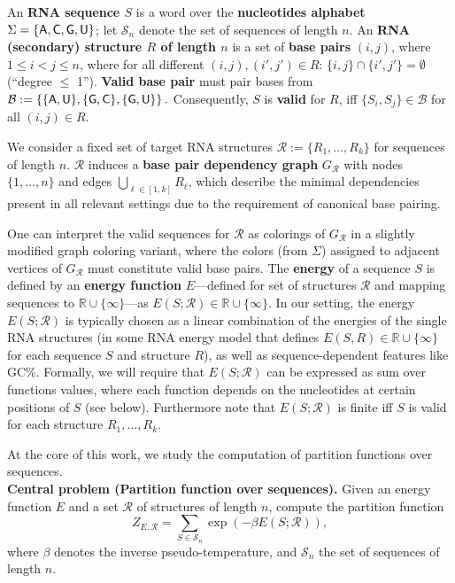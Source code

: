 \documentclass{bioinfo}
\newcommand{\partfun}[1]{Z_{#1}}
\newcommand{\B}{\mathcal{B}}
\newcommand{\R}{\mathcal{R}}
\renewcommand{\S}{\mathcal{S}}
\newcommand{\Def}[1]{{\bfseries #1}}
\newcommand{\Nuc}[1]{{\sf #1}}
\newcommand{\Ab}{\Nuc{A}}
\newcommand{\Cb}{\Nuc{C}}
\newcommand{\Gb}{\Nuc{G}}
\newcommand{\Ub}{\Nuc{U}}
\newcommand{\GCb}{\Gb\Cb}
\newcommand{\Energy}[2]{E(#2;#1)}
\begin{document}
An \Def{RNA sequence $S$} is a word over the \Def{nucleotides
  alphabet} $\Sigma=\{\Ab,\Cb,\Gb,\Ub\}$; let $\S_n$ denote the set of
sequences of length $n$. An \Def{RNA (secondary) structure $R$ of
  length $n$} is a set of \Def{base pairs} $(i,j)$, where
$1\leq i<j\leq n$, where for all different $(i,j), (i',j')\in R$:
$\{i,j\}\cap\{i',j'\}=\emptyset$ (``degree $\leq$ 1'').
%
%
\Def{Valid base pair} must pair bases from
$\B:=\left\{\{\Ab,\Ub\},\{\Gb,\Cb\},\{\Gb,\Ub\}\right\}.$
Consequently, $S$ is \Def{valid} for $R$, iff $\{S_i,S_j\}\in \B$ for
all $(i,j)\in R$.

We consider a fixed set of target RNA structures
$\R:=\{R_1, \dots, R_k\}$ for sequences of length $n$. $\R$ induces a
\Def{base pair dependency graph} $G_{\R}$ with nodes $\{1,\dots,n\}$
and edges $\bigcup_{\ell\in[1,k]} R_\ell$, which describe the minimal
dependencies present in all relevant settings due to the requirement
of canonical base pairing.

One can interpret the valid sequences for $\R$ as colorings of
$G_{\R}$ in a slightly modified graph coloring variant, where the
colors (from $\Sigma$) assigned to adjacent vertices of $G_{\R}$ must
constitute valid base pairs.
%
The \Def{energy} of a sequence $S$ is defined by an \Def{energy
  function} $E$---defined for set of structures $\R$ and mapping
sequences to $\mathbb{R}\cup\{\infty\}$---as
$\Energy{\R}{S} \in \mathbb{R}\cup\{\infty\}$. In our setting, the
energy $\Energy{\R}{S}$ is typically chosen as a linear combination of
the energies of the single RNA structures (in some RNA energy model
that defines $E(S,R) \in \mathbb{R}\cup\{\infty\}$ for each
sequence $S$ and structure
$R$), as well as sequence-dependent features like \GCb\%. Formally, we
will require that
$\Energy{\R}{S}$ can be expressed as sum over functions values, where
each function depends on the nucleotides at certain positions of
$S$ (see below). Furthermore note that
$\Energy{\R}{S}$ is finite iff
$S$ is valid for each structure $R_1,\dots,R_k$.

At the core of this work, we study the computation of partition
functions over sequences.\smallskip\\
\textbf{Central problem (Partition function over sequences).}
  Given an energy function $E$ and a set $\R$ of structures of length $n$, compute the
  partition function
  \begin{equation}
    \label{eq:mainproblem}
    \partfun{E,\R} = \sum_{S\in\S_n} \exp(-\beta \Energy{\R}{S}),
  \end{equation}
  where $\beta$ denotes the inverse pseudo-temperature, and $\S_n$ the set of sequences of length $n$.
\end{document}
